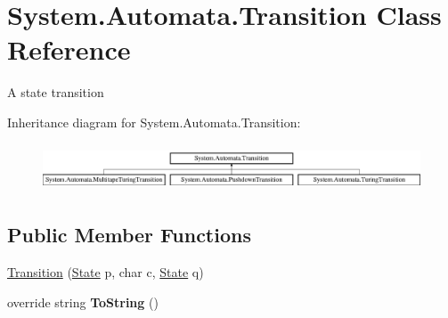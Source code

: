 \hypertarget{class_system_1_1_automata_1_1_transition}{}\section{System.\+Automata.\+Transition Class Reference}
\label{class_system_1_1_automata_1_1_transition}


A state transition  


Inheritance diagram for System.\+Automata.\+Transition\+:\begin{figure}[H]
\begin{center}
\leavevmode
\includegraphics[height=1.424936cm]{class_system_1_1_automata_1_1_transition}
\end{center}
\end{figure}
\subsection*{Public Member Functions}
\begin{DoxyCompactItemize}
\item 
\mbox{\hyperlink{class_system_1_1_automata_1_1_transition_a15b9c85b9017f971a4d919975ed0d8d5}{Transition}} (\mbox{\hyperlink{class_system_1_1_automata_1_1_state}{State}} p, char c, \mbox{\hyperlink{class_system_1_1_automata_1_1_state}{State}} q)
\item 
\mbox{\label{class_system_1_1_automata_1_1_transition_abdcef086901adb0c629d9c6507dc6697}} 
override string {\bfseries To\+String} ()
\end{DoxyCompactItemize}
